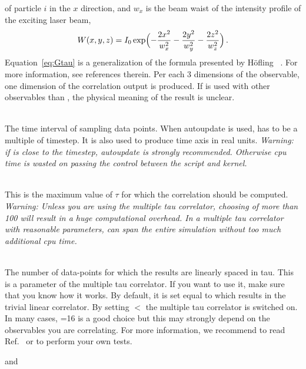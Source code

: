 \begin{arguments}
\begin{itemize}
    of particle $i$ in the $x$ direction, and $w_x$ is the beam waist of the intensity profile 
    of the exciting laser beam,
    \begin{equation}
    W(x,y,z) = I_0 \exp \Bigl( - \frac{2x^2}{w_x^2} - \frac{2y^2}{w_y^2} - \frac{2z^2}{w_z^2} \Bigr)\,.
    \end{equation}
    Equation~\eqref{eq:Gtau} is a generalization of the formula presented by 
    H\"ofling \etal~\cite{hofling11a}. For more information, see references therein.
    Per each 3 dimensions of the observable, one dimension of the correlation output
    is produced. If  is used with other observables than 
    , the physical meaning of the result is unclear.
  \end{itemize}
\item {} \\
  The time interval of sampling data points. When autoupdate is used,  has
  to be a multiple of timestep. It is also used to produce time axis in real units.
  \textit{Warning: if  is close to the timestep, autoupdate is strongly recommended.
  Otherwise cpu time is wasted on passing the control between the script and kernel.}
\item {} \\
  This is the maximum value of $\tau$ for which the correlation should be computed.
  \textit{Warning: Unless you are using the multiple tau correlator, choosing 
  of more than 100 will result in a huge computational overhead.
  In a multiple tau correlator with reasonable parameters, 
   can span the entire simulation without
  too much additional cpu time.}
\item {} \\
  The number of data-points for which the results are linearly spaced
  in tau.  This is a parameter of the multiple tau correlator. If you
  want to use it, make sure that you know how it works. By default, it
  is set equal to  which results in the trivial linear
  correlator. By setting  $<$  the multiple
  tau correlator is switched on. In many cases, =16 is a
  good choice but this may strongly depend on the observables you are
  correlating.  For more information, we recommend to read
  Ref.~\cite{ramirez10a} or to perform your own tests.
\item {} and  \\

\end{arguments}
